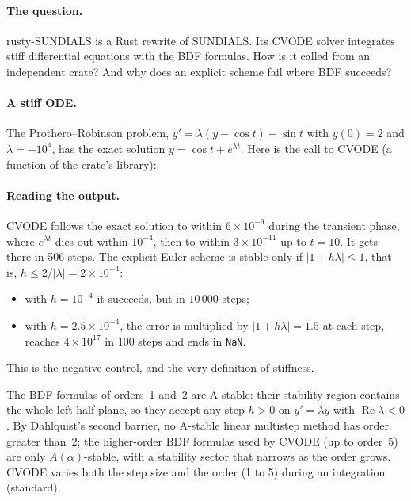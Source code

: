 \paragraph{The question.} rusty-SUNDIALS is a Rust rewrite of SUNDIALS. Its CVODE solver integrates stiff differential
equations with the BDF formulas. How is it called from an independent crate? And why does an explicit scheme fail where
BDF succeeds?

\paragraph{A stiff ODE.} The Prothero--Robinson problem, $y'=\lambda(y-\cos t)-\sin t$ with $y(0)=2$ and
$\lambda=-10^4$, has the exact solution $y=\cos t+e^{\lambda t}$. Here is the call to CVODE (a function of the crate's
library):


\paragraph{Reading the output.} CVODE follows the exact solution to within $6\times10^{-9}$ during the transient phase,
where $e^{\lambda t}$ dies out within $10^{-4}$, then to within $3\times10^{-11}$ up to $t=10$. It gets there in 506
steps. The explicit Euler scheme is stable only if $|1+h\lambda|\le1$, that is, $h\le2/|\lambda|=2\times10^{-4}$:
\begin{itemize}
\item with $h=10^{-4}$ it succeeds, but in $10\,000$ steps;
\item with $h=2.5\times10^{-4}$, the error is multiplied by $|1+h\lambda|=1.5$ at each step, reaches $4\times10^{17}$
in 100 steps and ends in \texttt{NaN}.
\end{itemize}
This is the negative control, and the very definition of stiffness.

\begin{uniremark}\tierL{} The BDF formulas of orders~1 and~2 are A-stable: their stability region contains the whole
left half-plane, so they accept any step $h>0$ on $y'=\lambda y$ with $\operatorname{Re}\lambda<0$. By Dahlquist's
second barrier, no A-stable linear multistep method has order greater than~2; the higher-order BDF formulas used by CVODE
(up to order~5) are only $A(\alpha)$-stable, with a stability sector that narrows as the order grows. CVODE varies both the step
size and the order (1 to 5) during an integration~\cite{app:sundials} (standard).\end{uniremark}

